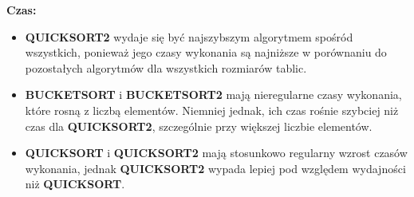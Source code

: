\documentclass{article}
\begin{document}
			\textbf{Czas:}
			\begin{itemize}
				\item \textbf{QUICKSORT2} wydaje się być najszybszym algorytmem spośród wszystkich, ponieważ jego czasy wykonania są najniższe w porównaniu do pozostałych algorytmów dla wszystkich rozmiarów tablic.
				\item \textbf{BUCKETSORT} i \textbf{BUCKETSORT2} mają nieregularne czasy wykonania, które rosną z liczbą elementów. Niemniej jednak, ich czas rośnie szybciej niż czas dla \textbf{QUICKSORT2}, szczególnie przy większej liczbie elementów.
				\item \textbf{QUICKSORT} i \textbf{QUICKSORT2} mają stosunkowo regularny wzrost czasów wykonania, jednak \textbf{QUICKSORT2} wypada lepiej pod względem wydajności niż \textbf{QUICKSORT}.
			\end{itemize}
		
\end{document}
